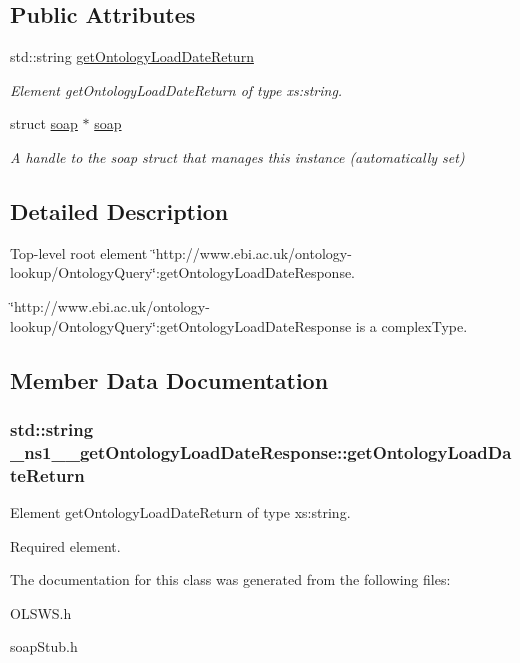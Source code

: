 \subsection*{Public Attributes}
\begin{DoxyCompactItemize}
\item 
std::string \hyperlink{class__ns1____getOntologyLoadDateResponse_a9e203fc3367f98cabbf5f055f2028004}{getOntologyLoadDateReturn}
\begin{DoxyCompactList}\small\item\em Element getOntologyLoadDateReturn of type xs:string. \end{DoxyCompactList}\item 
\hypertarget{class__ns1____getOntologyLoadDateResponse_a1c38450249fce62aefb25934b4e81579}{
struct \hyperlink{class__ns1____getOntologyLoadDateResponse_a1c38450249fce62aefb25934b4e81579}{soap} $\ast$ \hyperlink{class__ns1____getOntologyLoadDateResponse_a1c38450249fce62aefb25934b4e81579}{soap}}
\label{class__ns1____getOntologyLoadDateResponse_a1c38450249fce62aefb25934b4e81579}

\begin{DoxyCompactList}\small\item\em A handle to the soap struct that manages this instance (automatically set) \end{DoxyCompactList}\end{DoxyCompactItemize}


\subsection{Detailed Description}
Top-\/level root element \char`\"{}http://www.ebi.ac.uk/ontology-\/lookup/OntologyQuery\char`\"{}:getOntologyLoadDateResponse. 

\char`\"{}http://www.ebi.ac.uk/ontology-\/lookup/OntologyQuery\char`\"{}:getOntologyLoadDateResponse is a complexType. 

\subsection{Member Data Documentation}
\hypertarget{class__ns1____getOntologyLoadDateResponse_a9e203fc3367f98cabbf5f055f2028004}{
\subsubsection[{getOntologyLoadDateReturn}]{\setlength{\rightskip}{0pt plus 5cm}std::string {\bf \_\-ns1\_\-\_\-getOntologyLoadDateResponse::getOntologyLoadDateReturn}}}
\label{class__ns1____getOntologyLoadDateResponse_a9e203fc3367f98cabbf5f055f2028004}


Element getOntologyLoadDateReturn of type xs:string. 

Required element. 

The documentation for this class was generated from the following files:\begin{DoxyCompactItemize}
\item 
OLSWS.h\item 
soapStub.h\end{DoxyCompactItemize}

